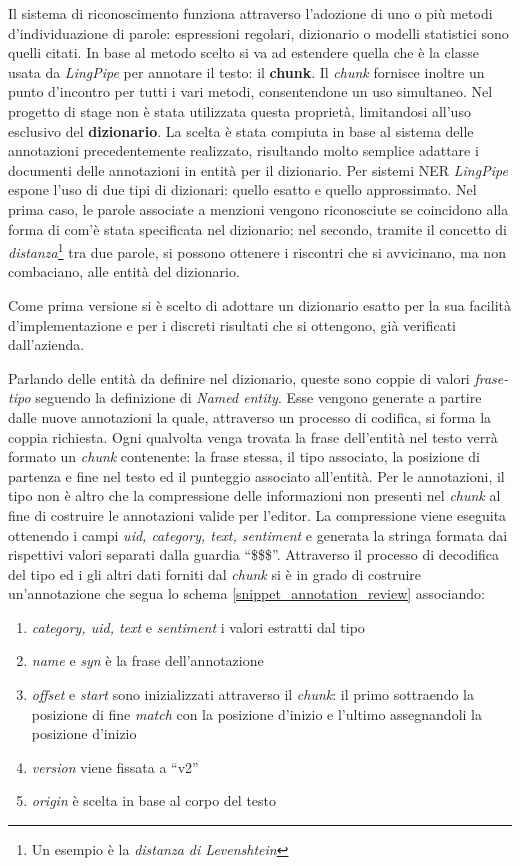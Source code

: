 Il sistema di riconoscimento funziona attraverso l'adozione di uno o più metodi
d'individuazione di parole: espressioni regolari, dizionario o modelli
statistici sono quelli citati. In base al metodo scelto si va ad estendere
quella che è la classe usata da \textit{LingPipe} per annotare il testo: il
\textbf{chunk}. Il \textit{chunk} fornisce inoltre un punto d'incontro per tutti
i vari metodi, consentendone un uso simultaneo. Nel progetto di stage non è
stata utilizzata questa proprietà, limitandosi all'uso esclusivo del
\textbf{dizionario}. La scelta è stata compiuta in base al sistema delle
annotazioni precedentemente realizzato, risultando molto semplice adattare i
documenti delle annotazioni in entità per il dizionario. Per sistemi \gls{NER}
\textit{LingPipe} espone l'uso di due tipi di dizionari: quello esatto e quello
approssimato. Nel prima caso, le parole associate a menzioni vengono
riconosciute se coincidono alla forma di com'è stata specificata nel dizionario;
nel secondo, tramite il concetto di \textit{distanza}\footnote{Un esempio è la
\textit{distanza di Levenshtein}} tra due parole, si possono ottenere i
riscontri che si avvicinano, ma non combaciano, alle entità del dizionario.

Come prima versione si è scelto di adottare un dizionario esatto per la sua
facilità d'implementazione e per i discreti risultati che si ottengono, già
verificati dall'azienda.

Parlando delle entità da definire nel dizionario, queste sono coppie di valori
\textit{frase-tipo} seguendo la definizione di \textit{Named entity}. Esse
vengono generate a partire dalle nuove annotazioni la quale, attraverso un
processo di codifica, si forma la coppia richiesta. Ogni qualvolta venga trovata
la frase dell'entità nel testo verrà formato un \textit{chunk} contenente:
la frase stessa, il tipo associato, la posizione di partenza e fine nel testo ed
il punteggio associato all'entità. Per le annotazioni, il tipo non è altro che
la compressione delle informazioni non presenti nel \textit{chunk} al fine di
costruire le annotazioni valide per l'editor. La compressione viene eseguita
ottenendo i campi \textit{uid, category, text, sentiment} e generata la stringa
formata dai rispettivi valori separati dalla guardia ``\$\$\$''. Attraverso il
processo di decodifica del tipo ed i gli altri dati forniti dal \textit{chunk}
si è in grado di costruire un'annotazione che segua lo schema
\ref{snippet_annotation_review} associando:

\begin{enumerate}
\item \textit{category, uid, text} e \textit{sentiment} i valori estratti dal
tipo
\item \textit{name} e \textit{syn} è la frase dell'annotazione
\item \textit{offset} e \textit{start} sono inizializzati attraverso il
\textit{chunk}: il primo sottraendo la posizione di fine \textit{match} con la
posizione d'inizio e l'ultimo assegnandoli la posizione d'inizio
\item \textit{version} viene fissata a ``v2''
\item \textit{origin} è scelta in base al corpo del testo
\end{enumerate}

